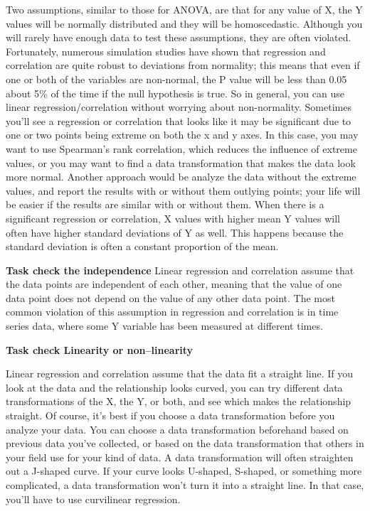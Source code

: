 \documentclass[a4paper]{article}
\begin{document}
Two assumptions, similar to those for ANOVA, are that for any value of X, the Y values will be normally distributed and they will be homoscedastic. Although you will rarely have enough data to test these assumptions, they are often violated.
Fortunately, numerous simulation studies have shown that regression and correlation are quite robust to deviations from normality; this means that even if one or both of the variables are non-normal, the P value will be less than 0.05 about 5\% of the time if the null hypothesis is true. So in general, you can use linear regression/correlation without worrying about non-normality.
Sometimes you'll see a regression or correlation that looks like it may be significant due to one or two points being extreme on both the x and y axes. In this case, you may want to use Spearman's rank correlation, which reduces the influence of extreme values, or you may want to find a data transformation that makes the data look more normal. Another approach would be analyze the data without the extreme values, and report the results with or without them outlying points; your life will be easier if the results are similar with or without them.
When there is a significant regression or correlation, X values with higher mean Y values will often have higher standard deviations of Y as well. This happens because the standard deviation is often a constant proportion of the mean. 

\textbf{Task check the independence}
Linear regression and correlation assume that the data points are independent of each other, meaning that the value of one data point does not depend on the value of any other data point. The most common violation of this assumption in regression and correlation is in time series data, where some Y variable has been measured at different times.


\textbf{Task check Linearity or non--linearity}

Linear regression and correlation assume that the data fit a straight line. If you look at the data and the relationship looks curved, you can try different data transformations of the X, the Y, or both, and see which makes the relationship straight. Of course, it's best if you choose a data transformation before you analyze your data. You can choose a data transformation beforehand based on previous data you've collected, or based on the data transformation that others in your field use for your kind of data.
A data transformation will often straighten out a J-shaped curve. If your curve looks U-shaped, S-shaped, or something more complicated, a data transformation won't turn it into a straight line. In that case, you'll have to use curvilinear regression.
\end{document}
